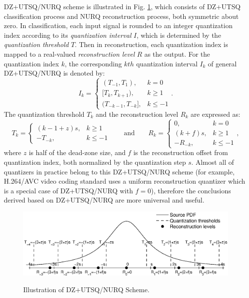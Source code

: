 \documentclass[smallabstract,smallcaptions]{dccpaper}
\begin{document}
DZ+UTSQ/NURQ scheme is illustrated in Fig. \ref{fig:DZ+UTSQ_NURQ}, which consists of DZ+UTSQ classification process and NURQ reconstruction process, both symmetric about zero. In classification, each input signal is rounded to an integer quantization index according to its \emph{quantization interval} $I$, which is determined by the \emph{quantization threshold} $T$. Then in reconstruction, each quantization index is mapped to a real-valued \emph{reconstruction level} $R$ as the output. For the quantization index $k$, the corresponding $kth$ quantization interval $I_{k}$ of general DZ+UTSQ/NURQ is denoted by:
\begin{equation}
\label{equ:interval}
I_{k}=\left\{ \begin{array}{ll}
(T_{-1}, T_{1}),         & k = 0 \\
{[T_{k}, T_{k+1})},        & k \ge 1 \\
(T_{-k-1}, T_{-k}],      & k \le -1
\end{array}\right. .
\end{equation}
The quantization threshold $T_{k}$ and the reconstruction level $R_{k}$ are expressed as:
\begin{equation}
\label{equ:DZ+UTSQ/NURQ}
T_{k}=\left\{ \begin{array}{ll}
(k-1+z)s, & k \ge 1 \\
-T_{-k},  & k \le -1
\end{array}\right.
\qquad \textrm{and} \qquad
R_{k}=\left\{ \begin{array}{ll}
0,        & k = 0 \\
(k+f)s,   & k \ge 1 \\
-R_{-k},  & k \le -1
\end{array}\right. ,
\end{equation}
where $z$ is half of the dead-zone size, and $f$ is the reconstruction offset from quantization index, both normalized by the quantization step $s$. Almost all of quantizers in practice belong to this DZ+UTSQ/NURQ scheme (for example, H.264/AVC video coding standard uses a uniform reconstruction quantizer which is a special case of DZ+UTSQ/NURQ with $f=0$), therefore the conclusions derived based on DZ+UTSQ/NURQ are more universal and useful.

\begin{figure}[tp]
\centering
\includegraphics[width = 1.0\linewidth]{Figures/section2/DZ+UTSQ_NURQ}\\
\caption{\label{fig:DZ+UTSQ_NURQ}%
Illustration of DZ+UTSQ/NURQ Scheme.}
\vspace{5pt}
\end{figure}
\end{document}
